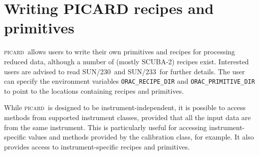 \documentclass[twoside,11pt]{article}
\newcommand{\xref}[3]{#1}
\renewcommand{\_}{\texttt{\symbol{95}}}
\newcommand{\oracsun}{\xref{SUN/230}{sun230}{}}
\newcommand{\oracprogsun}{\xref{SUN/233}{sun233}{}}
\newcommand{\picard}{\textsc{picard}}
\begin{document}
\section{Writing PICARD recipes and primitives\label{se:write}}

\picard\ allows users to write their own primitives and recipes for
processing reduced data, although a number of (mostly SCUBA-2) recipes
exist. Interested users are advised to read \oracsun\ and
\oracprogsun\ for further details. The user can specify the
environment variables \verb+ORAC_RECIPE_DIR+ and
\verb+ORAC_PRIMITIVE_DIR+ to point to the locations containing recipes
and primitives.

While \picard\ is designed to be instrument-independent, it is
possible to access methods from supported instrument classes, provided
that all the input data are from the same instrument. This is
particularly useful for accessing instrument-specific values and
methods provided by the calibration class, for example. It also
provides access to instrument-specific recipes and primitives.
\end{document}
